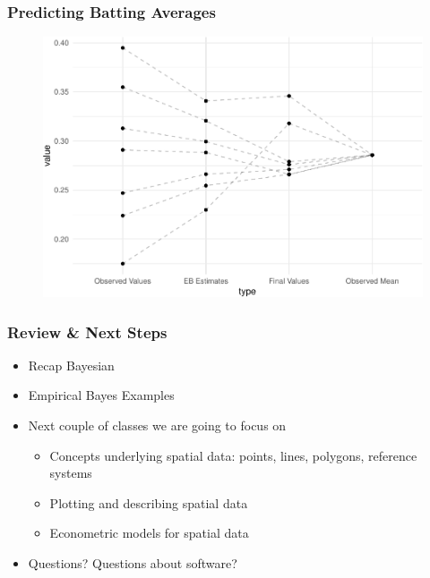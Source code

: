 \documentclass[
  shownotes,
  xcolor={svgnames},
  hyperref={colorlinks,citecolor=DarkBlue,linkcolor=DarkRed,urlcolor=DarkBlue}
  ]{beamer}
\begin{document}
\begin{frame}[fragile]
\frametitle{Predicting Batting Averages}

\begin{figure}[H] \centering
  \centering
  \includegraphics[scale=0.5]{figures/shrinkage_future}
  \\
  \tiny 
\end{figure}



\end{frame}



\begin{frame}
\frametitle{Review \& Next Steps}
  
  \begin{itemize} 
    \item Recap Bayesian
    \medskip
    \item Empirical Bayes Examples
    
  \bigskip  

\item  Next couple of classes we are going to focus on 
  \begin{itemize}
      \item Concepts underlying spatial data: points, lines, polygons, reference systems
      \medskip
      \item Plotting and describing spatial data
      \medskip
      \item Econometric models for spatial data
\end{itemize}

\bigskip  
\item Questions? Questions about software? 

\end{itemize}
\end{frame}
\end{document}
